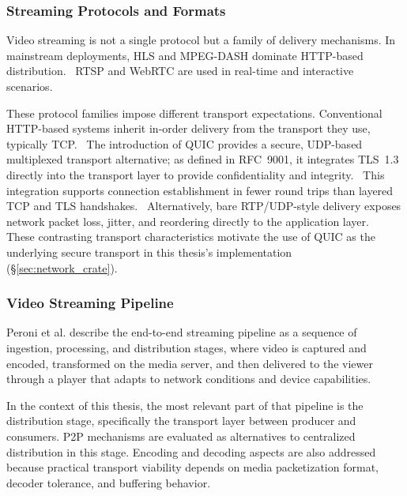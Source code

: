 \subsubsection{Streaming Protocols and Formats}
Video streaming is not a single protocol but a family of delivery mechanisms. In mainstream deployments, HLS and MPEG-DASH dominate HTTP-based distribution.~\cite{pantos_http_2017,noauthor_standards_nodate} RTSP and WebRTC are used in real-time and interactive scenarios.~\cite{schulzrinneRealTimeStreamingProtocol2016,noauthor_webrtc_nodate,peroniEndtoEndPipelinePerspective2025}

These protocol families impose different transport expectations. Conventional HTTP-based systems inherit in-order delivery from the transport they use, typically TCP.~\cite{pantos_http_2017} The introduction of \ac{QUIC} provides a secure, UDP-based multiplexed transport alternative; as defined in RFC~9001, it integrates \ac{TLS}~1.3 directly into the transport layer to provide confidentiality and integrity.~\cite{thomsonUsingTLSSecure2021} This integration supports connection establishment in fewer round trips than layered TCP and \ac{TLS} handshakes.~\cite{thomsonUsingTLSSecure2021} Alternatively, bare \ac{RTP}/UDP-style delivery exposes network packet loss, jitter, and reordering directly to the application layer.~\cite{schulzrinne_rtp_2003} These contrasting transport characteristics motivate the use of \ac{QUIC} as the underlying secure transport in this thesis's implementation (\S\ref{sec:network_crate}).


\subsubsection{Video Streaming Pipeline}
Peroni et al. describe the end-to-end streaming pipeline as a sequence of ingestion, processing, and distribution stages, where video is captured and encoded, transformed on the media server, and then delivered to the viewer through a player that adapts to network conditions and device capabilities.~\cite{peroniEndtoEndPipelinePerspective2025}

In the context of this thesis, the most relevant part of that pipeline is the distribution stage, specifically the transport layer between producer and consumers. \ac{P2P} mechanisms are evaluated as alternatives to centralized distribution in this stage. Encoding and decoding aspects are also addressed because practical transport viability depends on media packetization format, decoder tolerance, and buffering behavior.

